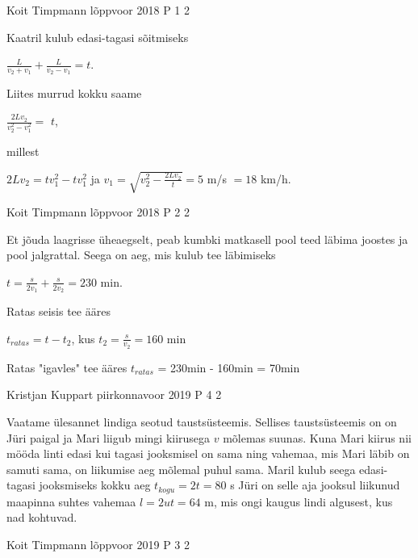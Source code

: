 \documentclass[11pt]{article}
\begin{document}
{%
{Koit Timpmann} %
{lõppvoor} %
{2018} %
{P 1} %
{2} %
{

\ifSolution
Kaatril kulub edasi-tagasi sõitmiseks 
\begin{center}
$\frac{L}{v_2 + v_1} + \frac{L}{v_2 - v_1} = t$.
\end{center}
Liites murrud kokku saame 
\begin{center}
$\frac{2Lv_2}{v_2 ^2 - v_1 ^2} =$ $t$, 
\end{center}
millest
\begin{center}
$2Lv_2 = tv_1 ^2 - tv_1 ^2$ ja $v_1 = \sqrt{ v_2 ^2 - \frac{2Lv_2}{t}} = 5$ m/s $= 18$ km/h.
\end{center}
\fi
}

{Koit Timpmann} %
{lõppvoor} %
{2018} %
{P 2} %
{2} %
{

\ifSolution
Et jõuda laagrisse üheaegselt, peab kumbki matkasell pool teed läbima joostes ja pool jalgrattal. Seega on aeg, mis kulub tee läbimiseks 
\begin{center}
$t = \frac{s}{2v_1} + \frac{s}{2v_2} = 230$ min.
\end{center}
Ratas seisis tee ääres
\begin{center}
$t_{ratas} = t - t_2$, kus $t_2 = \frac{s}{v_2} = 160$ min
\end{center}
Ratas "igavles" tee ääres $t_{ratas}$ = 230min - 160min = 70min
\fi
}

{Kristjan Kuppart} %
{piirkonnavoor} %
{2019} %
{P 4} %
{2} %
{

\ifSolution
Vaatame ülesannet lindiga seotud taustsüsteemis. Sellises taustsüsteemis on on Jüri paigal ja Mari liigub mingi kiirusega $v$ mõlemas suunas. Kuna Mari kiirus nii mööda linti edasi kui tagasi jooksmisel on sama ning vahemaa, mis Mari läbib on samuti sama, on liikumise aeg mõlemal puhul sama. Maril kulub seega edasi-tagasi jooksmiseks kokku aeg $t_{kogu} = 2t = 80$ s Jüri on selle aja jooksul liikunud maapinna suhtes vahemaa $l = 2ut = 64$ m, mis ongi kaugus lindi algusest, kus nad kohtuvad.
\fi
}


{Koit Timpmann} %
{lõppvoor} %
{2019} %
{P 3} %
{2} %
{

}}
\end{document}
